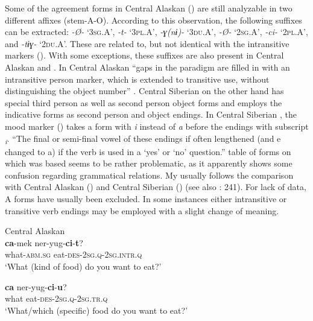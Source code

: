 Some of the agreement forms in Central Alaskan  () are still analyzable in two different affixes (stem-A-O). According to this observation, the following suffixes can be extracted: \textit{-Ø-} ‘3\textsc{sg}.A’, \textit{-t-} ‘\textsc{3pl.A}’, \textit{-ɣ(nɨ)-} ‘\textsc{3du.A}’, \textit{-Ø-} ‘2\textsc{sg}.A’, \textit{-ci-} ‘\textsc{2pl.A}’, and \textit{-tɨɣ-} ‘\textsc{2du.A}’. These are related to, but not identical with the intransitive markers (). With some exceptions, these suffixes are also present in Central Alaskan  and  . In Central Alaskan  “gaps in the paradigm are filled in with an intransitive person marker, which is extended to transitive use, without distinguishing the object number” \citep[1350]{Miyaoka2012}. Central Siberian  on the other hand has special third person as well as second person  object forms and employs the indicative forms as second person  and  object endings. In Central Siberian , the  mood marker () takes a form with \textit{i} instead of \textit{a} before the endings with subscript \textit{\textsubscript{i}}. “The final or semi-final vowel of these endings if often lengthened (and e changed to a) if the verb is used in a ‘yes’ or ‘no’ question.” \citep[61]{Jacobson1979}  table of  forms on which  was based seems to be rather problematic, as it apparently shows some confusion regarding grammatical relations. My  usually follows the comparison with Central Alaskan () and Central Siberian  () (see also \citealt{Menovshchikov1975}: 241). For lack of data,  A forms have usually been excluded. In some instances either intransitive or transitive verb endings may be employed with a slight change of meaning.

\ea%
    \label{ex:eska:11}
    Central Alaskan \\
    \ea
    \gll \textbf{{ca}}-mek    ner-yug-\textbf{{ci}}-\textbf{{t}}?\\
    what-\textsc{abm.sg}  eat-\textsc{des}-2\textsc{sg.q}-2\textsc{sg.intr.q}\\
    \glt ‘What (kind of food) do you want to eat?’
    
    \ex
    \gll \textbf{{ca}} ner-yug-\textbf{{ci}}-\textbf{{u}}?\\
    what    eat-\textsc{des}-2\textsc{sg.q}-2\textsc{sg.tr.q}\\
    \glt ‘What/which (specific) food do you want to eat?’ \citep[756]{Miyaoka2012}
    \z
    \z

